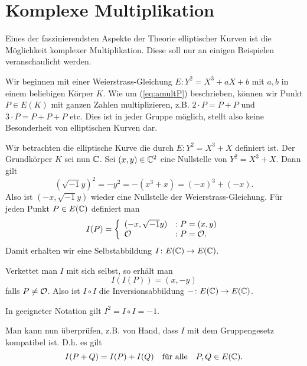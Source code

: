 \chapter{Komplexe Multiplikation}

Eines der faszinierendsten Aspekte der Theorie elliptischer Kurven ist
die Möglichkeit komplexer Multiplikation. Diese soll nur an einigen
Beispielen veranschaulicht werden.

Wir beginnen mit einer Weierstrass-Gleichung $E : Y^2=X^3+aX+b$ mit
$a,b$ in einem beliebigen Körper $K$. Wie um (\ref{eq:amultP}) beschrieben,
können wir Punkt $P\in E(K)$ mit ganzen Zahlen multiplizieren, z.B.
$2\cdot P = P+P$ und $3\cdot P = P+P+P$ etc. Dies ist  in jeder Gruppe möglich,
stellt also keine Besonderheit von elliptischen Kurven dar. 

\begin{beispiel}
  Wir betrachten die elliptische Kurve die durch  $E: Y^2 = X^3+X$
  definiert ist. Der Grundkörper $K$ sei nun ${\mathbb{C}}$.
  Sei $(x,y)\in{\mathbb{C}}^2$ eine Nullstelle von $Y^2 = X^3+X$. Dann gilt
  \begin{equation*}
    (\sqrt{-1} y)^2 = -y^2 = -(x^3+x) = (-x)^3+(-x). 
  \end{equation*}
  Also ist $(-x,\sqrt{-1}y)$ wieder eine Nullstelle der
  Weierstrass-Gleichung. 
  Für jeden Punkt $P\in E({\mathbb{C}})$ definiert man
  \begin{equation*}
    I(P) = \left\{
      \begin{array}{ll}
        (-x, \sqrt{-1}y)         &: P = (x,y) \\
        {\mathcal O} &: P = {\mathcal O}.
      \end{array}\right.
  \end{equation*}
  Damit erhalten wir eine Selbstabbildung $I\colon E({\mathbb{C}})\rightarrow
  E({\mathbb{C}})$.

  Verkettet man $I$ mit sich selbst, so erhält man 
  \begin{equation*}
    I(I(P)) = (x,-y)
  \end{equation*}
  falls $P\not={\mathcal O}$. Also ist $I\circ I$ die Inversionsabbildung
  $-\colon E({\mathbb{C}})\rightarrow E({\mathbb{C}})$.

  In geeigneter Notation gilt $I^2 = I\circ I = -1$. 

  Man kann nun überprüfen, z.B. von Hand, dass $I$ mit dem
  Gruppengesetz kompatibel ist. D.h. es gilt
  \begin{equation*}
    I(P+Q) = I(P)+I(Q) \quad\text{für alle}\quad P,Q\in E({\mathbb{C}}). 
  \end{equation*}


\end{beispiel}
